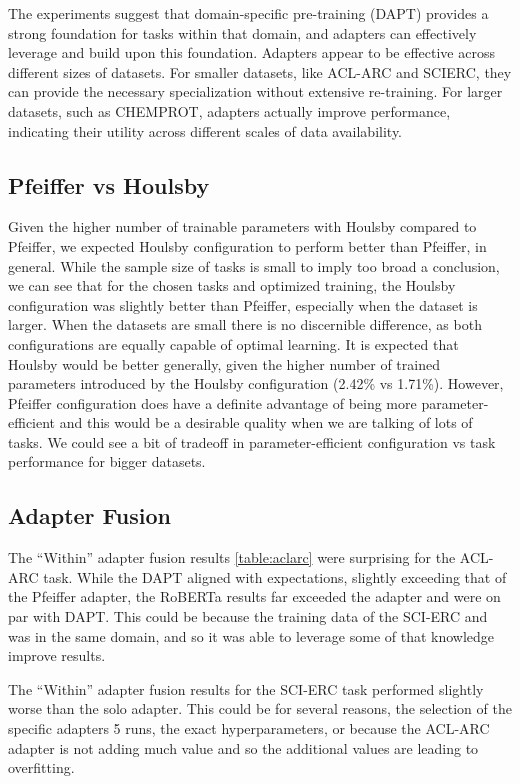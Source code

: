 \documentclass[10pt,twocolumn,letterpaper]{article}
\begin{document}
The experiments suggest that domain-specific pre-training (DAPT) provides a strong foundation for tasks within that domain, and adapters can effectively leverage and build upon this foundation. Adapters appear to be effective across different sizes of datasets. For smaller datasets, like ACL-ARC and SCIERC, they can provide the necessary specialization without extensive re-training. For larger datasets, such as CHEMPROT, adapters actually improve performance, indicating their utility across different scales of data availability.

\subsection{Pfeiffer vs Houlsby} 
Given the higher number of trainable parameters with Houlsby compared to Pfeiffer, we expected Houlsby configuration to perform better than Pfeiffer, in general. While the sample size of tasks is small to imply too broad a conclusion, we can see that for the chosen tasks and optimized training, the Houlsby configuration was slightly better than Pfeiffer, especially when the dataset is larger. When the datasets are small there is no discernible difference, as both configurations are equally capable of optimal learning. It is expected that Houlsby would be better generally, given the higher number of trained parameters introduced by the Houlsby configuration (2.42\% vs 1.71\%). However, Pfeiffer configuration does have a definite advantage of being more parameter-efficient and this would be a desirable quality when we are talking of lots of tasks. We could see a bit of tradeoff in parameter-efficient configuration vs task performance for bigger datasets.

\subsection{Adapter Fusion}
The “Within” adapter fusion results \ref{table:aclarc} were surprising for the ACL-ARC task. While the DAPT aligned with expectations, slightly exceeding that of the Pfeiffer adapter, the RoBERTa results far exceeded the adapter and were on par with DAPT. This could be because the training data of the SCI-ERC and was in the same domain, and so it was able to leverage some of that knowledge improve results.

The “Within” adapter fusion results for the SCI-ERC task performed slightly worse than the solo adapter. This could be for several reasons, the selection of the specific adapters 5 runs, the exact hyperparameters, or because the ACL-ARC adapter is not adding much value and so the additional values are leading to overfitting.
\end{document}
